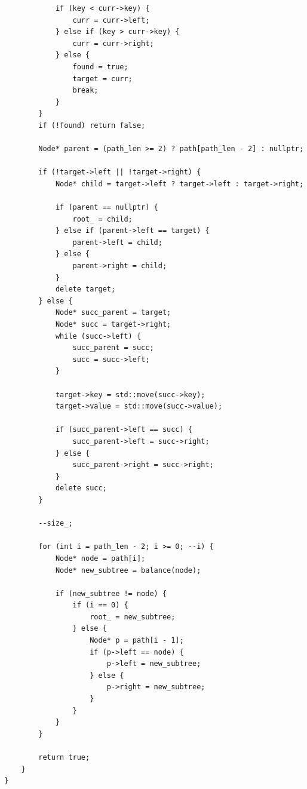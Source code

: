 \begin{lstlisting}
            if (key < curr->key) {
                curr = curr->left;
            } else if (key > curr->key) {
                curr = curr->right;
            } else {
                found = true;
                target = curr;
                break;
            }
        }
        if (!found) return false;

        Node* parent = (path_len >= 2) ? path[path_len - 2] : nullptr;

        if (!target->left || !target->right) {
            Node* child = target->left ? target->left : target->right;

            if (parent == nullptr) {
                root_ = child;
            } else if (parent->left == target) {
                parent->left = child;
            } else {
                parent->right = child;
            }
            delete target;
        } else {
            Node* succ_parent = target;
            Node* succ = target->right;
            while (succ->left) {
                succ_parent = succ;
                succ = succ->left;
            }

            target->key = std::move(succ->key);
            target->value = std::move(succ->value);

            if (succ_parent->left == succ) {
                succ_parent->left = succ->right;
            } else {
                succ_parent->right = succ->right;
            }
            delete succ;
        }

        --size_;

        for (int i = path_len - 2; i >= 0; --i) {
            Node* node = path[i];
            Node* new_subtree = balance(node);

            if (new_subtree != node) {
                if (i == 0) {
                    root_ = new_subtree;
                } else {
                    Node* p = path[i - 1];
                    if (p->left == node) {
                        p->left = new_subtree;
                    } else {
                        p->right = new_subtree;
                    }
                }
            }
        }

        return true;
    }
}
\end{lstlisting}
\newpage